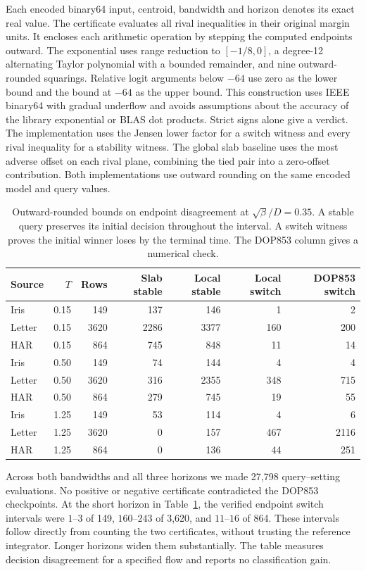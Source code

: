 Each encoded binary64 input, centroid, bandwidth and horizon denotes its
exact real value. The certificate evaluates all rival inequalities in
their original margin units. It encloses each arithmetic operation by
stepping the computed endpoints outward. The exponential uses range
reduction to $[-1/8,0]$, a degree-12 alternating Taylor polynomial with
a bounded remainder, and nine outward-rounded squarings. Relative logit
arguments below $-64$ use zero as the lower bound and the bound at $-64$
as the upper bound. This construction uses IEEE binary64 with gradual
underflow and avoids assumptions about the accuracy of the library
exponential or BLAS dot products. Strict signs alone give a verdict.
The implementation uses the Jensen lower factor for a switch witness
and every rival inequality for a stability witness. The global slab
baseline uses the most adverse offset on each rival plane, combining
the tied pair into a zero-offset contribution. Both implementations
use outward rounding on the same encoded model and query values.

\begin{table}[htbp]
\centering
\caption{Outward-rounded bounds on endpoint disagreement at
$\sqrt{\beta}/D=0.35$. A stable query preserves its initial decision
throughout the interval. A switch witness proves the initial winner
loses by the terminal time. The DOP853 column gives a numerical check.}
\label{tab:outward-transfer}
\begin{tabular}{lrrrrrr}
\toprule
Source & $T$ & Rows & Slab stable & Local stable & Local switch & DOP853 switch \\
\midrule
Iris & 0.15 & 149 & 137 & 146 & 1 & 2 \\
Letter & 0.15 & 3620 & 2286 & 3377 & 160 & 200 \\
HAR & 0.15 & 864 & 745 & 848 & 11 & 14 \\
Iris & 0.50 & 149 & 74 & 144 & 4 & 4 \\
Letter & 0.50 & 3620 & 316 & 2355 & 348 & 715 \\
HAR & 0.50 & 864 & 279 & 745 & 19 & 55 \\
Iris & 1.25 & 149 & 53 & 114 & 4 & 6 \\
Letter & 1.25 & 3620 & 0 & 157 & 467 & 2116 \\
HAR & 1.25 & 864 & 0 & 136 & 44 & 251 \\
\bottomrule
\end{tabular}
\end{table}

Across both bandwidths and all three horizons we made 27,798
query--setting evaluations. No positive or negative certificate
contradicted the DOP853 checkpoints. At the short horizon in
Table~\ref{tab:outward-transfer}, the verified endpoint switch
intervals were $1$--$3$ of 149, $160$--$243$ of 3,620, and $11$--$16$
of 864. These intervals follow directly from counting the two
certificates, without trusting the reference integrator. Longer
horizons widen them substantially. The table measures decision
disagreement for a specified flow and reports no classification gain.

